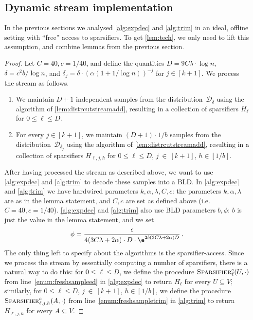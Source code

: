 \subsection{Dynamic stream implementation}
\label{subsec:dyn}
In the previous sections we analysed \cref{alg:expdec} and \cref{alg:trim} in an ideal, offline setting with ``free'' access to sparsifiers. To get \cref{lem:tech},  we only need to lift this assumption, and combine lemmas from the previous section.

\unified*

\begin{proof}
	Let $C=40, c=1/40$, and define the quantities $D=9C\lambda \cdot \log n$, $\delta=c^2b/\log n$, and $\delta_j=\delta \cdot (\alpha(1+1/\log n))^{-j}$ for $j \in [k+1]$. We process the stream as follows.
	\begin{enumerate}
		\item We maintain $D+1$ independent samples from the distribution~$\mathcal{D}_\delta$ using the algorithm of  \cref{lem:distrcutstreamadd}, resulting in a collection of sparsifiers $H_\ell$ for $0 \le \ell \le D$.
		\item For every $j \in [k+1]$, we maintain $(D+1) \cdot 1/b$ samples from the distribution~$\mathcal{D}_{\delta_j}$ using the algorithm of  \cref{lem:distrcutstreamadd}, resulting in a collection of sparsifiers $H_{\ell,j,h}$ for $0 \le \ell \le D$, $j~\in~[k+1]$, $h \in [1/b]$.
	\end{enumerate}
	
	\noindent
	After having processed the stream as described above, we want to use \cref{alg:expdec}  and \cref{alg:trim} to decode these samples into a BLD. In \cref{alg:expdec} and \cref{alg:trim} we have hardwired parameters $k,\alpha,\lambda,C,c$: the parameters $k,\alpha,\lambda$ are as in the lemma statement, and $C,c$ are set as defined above (i.e. $C=40, c=1/40$). \cref{alg:expdec} and \cref{alg:trim} also use BLD parameters $b,\phi$: $b$ is just the value in the lemma statement, and we set
	\begin{equation*}
		\phi = \frac{\epsilon}{4 (3C\lambda+2\alpha) \cdot D \cdot  \e^{2b (3C\lambda+2\alpha) D}} \, .
	\end{equation*}
	The only thing left to specify about the algorithms is the sparsifier-access. Since we process the stream by essentially computing a number of sparsifiers, there is a natural way to do this: for $0 \le \ell \le D$,  we define the procedure $\textsc{Sparsifier}^c_\ell(U,\cdot)$ from line~\eqref{enum:freshsampleed} in \cref{alg:expdec} to return $H_\ell$ for every $U \subseteq V$;  similarly, for $0 \le \ell \le D$, $j~\in~[k+1]$, $h \in [1/b]$, we define the procedure $\textsc{Sparsifier}^c_{\ell,j,h}(A,\cdot)$ from line~\eqref{enum:freshsampletrim} in \cref{alg:trim} to return $H_{\ell,j,h}$ for every $A \subseteq V$.
	

\end{proof}
